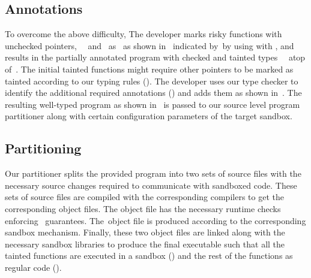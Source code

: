 \subsection{\systemname Annotations}
\label{subsec:moveregionstosbx}
To overcome the above difficulty, The developer marks risky functions with unchecked pointers,~\ie~ and~ as~ as shown in~ indicated by~\useradded by using with \systemname{},
 and results in the partially annotated program with checked and tainted types~\ie~ atop of~.
The initial tainted functions might require other pointers to be marked as tainted according to our typing rules ().
The developer uses our type checker to identify the additional required annotations (\usermods) and adds them as shown in~.
The resulting well-typed program as shown in~ is passed to our source level program partitioner along with certain configuration parameters of the target sandbox.

\subsection{Partitioning}
Our partitioner splits the provided program into two sets of source files with the necessary source changes required to communicate with sandboxed code.
These sets of source files are compiled with the corresponding compilers to get the corresponding object files.
The \cregion object file has the necessary runtime checks enforcing~\systemname{} guarantees.
The~\ucregion object file is produced according to the corresponding sandbox mechanism.
Finally, these two object files are linked along with the necessary sandbox libraries to produce the final executable such that all the tainted functions are executed in a sandbox (\ucregion) and the rest of the functions as regular code (\cregion).



